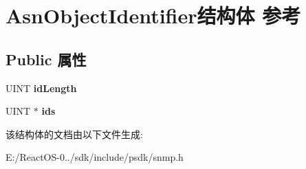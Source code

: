 \hypertarget{struct_asn_object_identifier}{}\section{Asn\+Object\+Identifier结构体 参考}
\label{struct_asn_object_identifier}
\subsection*{Public 属性}
\begin{DoxyCompactItemize}
\item 
\mbox{\label{struct_asn_object_identifier_a798ed1d8d9518503c3a21ce574ab5c4c}} 
U\+I\+NT {\bfseries id\+Length}
\item 
\mbox{\label{struct_asn_object_identifier_ab5508c4ecd495eca3e33d170b7beb69e}} 
U\+I\+NT $\ast$ {\bfseries ids}
\end{DoxyCompactItemize}


该结构体的文档由以下文件生成\+:\begin{DoxyCompactItemize}
\item 
E\+:/\+React\+O\+S-\/0../sdk/include/psdk/snmp.\+h\end{DoxyCompactItemize}
